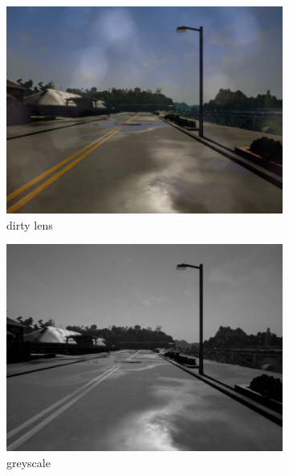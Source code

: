 \documentclass[14pt]{extarticle}
\begin{document}
\begin{figure}
\begin{subfigure}[b]{0.3\textwidth}
			 \includegraphics[scale=0.1]{./foto_sporcature/dirty_lens.png}
	         \caption{dirty lens}
	         \label{fig:dirty_lens}
	     \end{subfigure}
	     \hfill
	     \begin{subfigure}[b]{0.3\textwidth}
	         \centering
			 \includegraphics[scale=0.1]{./foto_sporcature/greyscale.png}
	         \caption{greyscale}
	         \label{fig:greyscale}
	     \end{subfigure}
	     \hfill
	     \begin{subfigure}[b]{0.3\textwidth}
	         \centering

\end{subfigure}
\end{figure}
\end{document}
